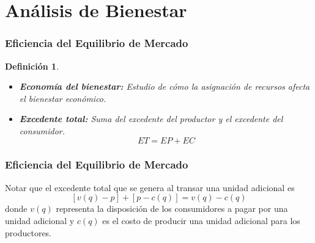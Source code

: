 \documentclass[dvipsnames,table,leqno]{beamer}
\newtheorem{mydef}{Definición}
\newcommand{\peq}[1]{{\scriptscriptstyle{#1}}}
\newcommand{\rp}[1]{\left(#1\right)}
\newcommand{\sqp}[1]{\left[#1\right]}
\begin{document}
\begin{frame}
\begin{figure}[hbtp!]
\begin{subfigure}[b]{0.49\textwidth}
				\end{subfigure}
			\end{figure}
		\end{frame}

	\section{Análisis de Bienestar}

		\begin{frame}
			\frametitle{Eficiencia del Equilibrio de Mercado}
			\begin{mydef}
				\begin{itemize}
					\item \textbf{Economía del bienestar:} Estudio de cómo la asignación de recursos afecta el bienestar económico.
					\item \textbf{Excedente total:} Suma del excedente del productor y el excedente del consumidor. $$ET=EP+EC$$
				\end{itemize}
			\end{mydef}
		\end{frame}

		\begin{frame}
			\frametitle{Eficiencia del Equilibrio de Mercado}
			Notar que el excedente total que se genera al transar una unidad adicional es $$\sqp{v\rp{q}-p}+\sqp{p-c\rp{q}}=v\rp{q}-c\rp{q}$$ donde $v\rp{q}$ representa la disposición de los consumidores a pagar por una unidad adicional y $c\rp{q}$ es el costo de producir una unidad adicional para los productores.
		\end{frame}
	
\end{document}
